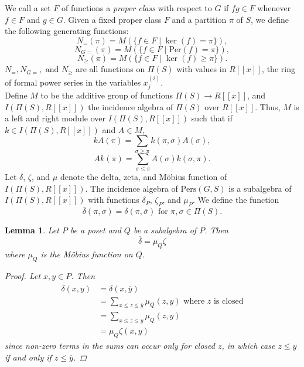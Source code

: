 \documentclass[psamsfonts]{amsart}
\newtheorem{lem}[thm]{Lemma}
\theoremstyle{definition}
\theoremstyle{remark}
\numberwithin{equation}{section}
\begin{document}
 \indent We call a set $F$ of functions a \textit{proper class} with respect to $G$ if $fg\in F$ whenever $f\in F$ and $g\in G$. Given a fixed proper class $F$ and a partition $\pi$ of $S$, we define the following generating functions:
\begin{equation}\label{generating function N=}
    N_{=}(\pi) = M(\{f\in F \mid \ker(f)=\pi\}),
\end{equation}
\begin{equation}\label{generating function NG=}
    N_{G=}(\pi)=M(\{f\in F \mid \text{Per}(f)=\pi\}),
\end{equation}
\begin{equation}\label{generating function N>=}
    N_{\geq}(\pi)=M(\{f\in F \mid \ker(f)\geq\pi\}).
\end{equation}
$N_{=}, N_{G=}, \text{ and } N_{\geq}$ are all functions on $\Pi(S)$ with values in $R[[x]]$, the ring of formal power series in the variables $x^{(i)}_j$.\\ 
\indent Define $M$ to be the additive group of functions $\Pi(S)\to R[[x]]$, and $I(\Pi(S),R[[x]])$ the incidence algebra of $\Pi(S)$ over $R[[x]]$. Thus, $M$ is a left and right module over $I(\Pi(S),R[[x]])$ such that if $k\in I(\Pi(S),R[[x]])$ and $A\in M$,
\begin{equation*}
kA(\pi)=\sum_{\sigma \geq \pi}k(\pi,\sigma)A(\sigma),
\end{equation*}
\begin{equation*}
    Ak(\pi)=\sum_{\sigma \leq \pi}A(\sigma)k(\sigma,\pi).
\end{equation*}
Let $\delta$, $\zeta$, and $\mu$ denote the delta, zeta, and M\"{o}bius function of $I(\Pi(S),R[[x]])$. The incidence algebra of $\text{Pers}(G,S)$ is a subalgebra of  $I(\Pi(S),R[[x]])$ with functions $\delta_P$, $\zeta_P$, and $\mu_P$. We define the function
\begin{equation}
    \overline{\delta}(\pi,\sigma)=\delta(\pi,\overline{\sigma}) \text{ for } \pi, \sigma\in \Pi(S).
\end{equation}

\begin{lem}\label{generating functions lemma 1}
Let $P$ be a poset and $Q$ be a subalgebra of $P$. Then \begin{equation}
    \overline{\delta}=\mu_{Q} \zeta
\end{equation} 
where $\mu_{Q}$ is the M\"{o}bius function on $Q$. 
\begin{proof}
Let $x,y\in P$. Then 
\begin{align*}
\overline{\delta}(x,y)&=\delta(x,\overline{y}) \\
&=\sum_{x\leq z\leq \overline{y}}\mu_Q(z,y) \text{ where $z$ is closed} \\
&=\sum_{x\leq z \leq y}\mu_Q(z,y)\\
&=\mu_Q\zeta(x,y)
\end{align*}
since non-zero terms in the sums can occur only for closed $z$, in which case $z\leq y$ if and only if $z\leq \overline{y}$.  
\end{proof}
\end{lem}
\end{document}
